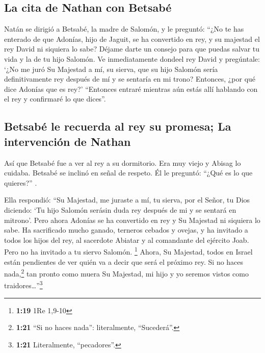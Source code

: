 \hypertarget{la-cita-de-nathan-con-betsabuxe9}{%
\subsection{La cita de Nathan con
Betsabé}\label{la-cita-de-nathan-con-betsabuxe9}}

 Natán se dirigió a Betsabé, la madre de Salomón, y le
preguntó: ``¿No te has enterado de que Adonías, hijo de Jaguit, se ha
convertido en rey, y su majestad el rey David ni siquiera lo sabe?
 Déjame darte un consejo para que puedas salvar tu vida y
la de tu hijo Salomón.  Ve inmediatamente dondeel rey
David y pregúntale: `¿No me juró Su Majestad a mí, su sierva, que su
hijo Salomón sería definitivamente rey después de mí y se sentaría en mi
trono? Entonces, ¿por qué dice Adonías que es rey?' 
``Entonces entraré mientras aún estás allí hablando con el rey y
confirmaré lo que dices''.

\hypertarget{betsabuxe9-le-recuerda-al-rey-su-promesa-la-intervenciuxf3n-de-nathan}{%
\subsection{Betsabé le recuerda al rey su promesa; La intervención de
Nathan}\label{betsabuxe9-le-recuerda-al-rey-su-promesa-la-intervenciuxf3n-de-nathan}}

 Así que Betsabé fue a ver al rey a su dormitorio. Era
muy viejo y Abisag lo cuidaba.  Betsabé se inclinó en
señal de respeto. Él le preguntó: ``¿Qué es lo que quieres?'' .

 Ella respondió: ``Su Majestad, me juraste a mí, tu
sierva, por el Señor, tu Dios diciendo: `Tu hijo Salomón serásin duda
rey después de mi y se sentará en mitrono'.  Pero ahora
Adonías se ha convertido en rey y Su Majestad ni siquiera lo sabe.
 Ha sacrificado mucho ganado, terneros cebados y ovejas,
y ha invitado a todos los hijos del rey, al sacerdote Abiatar y al
comandante del ejército Joab. Pero no ha invitado a tu siervo Salomón.
\footnote{\textbf{1:19} 1Re 1,9-10}  Ahora, Su Majestad,
todos en Israel están pendientes de ver quién va a decir que será el
próximo rey.  Si no haces nada,\footnote{\textbf{1:21}
  ``Si no haces nada'': literalmente, ``Sucederá''.} tan pronto como
muera Su Majestad, mi hijo y yo seremos vistos como
traidores\ldots{}''\footnote{\textbf{1:21} Literalmente, ``pecadores''.}

